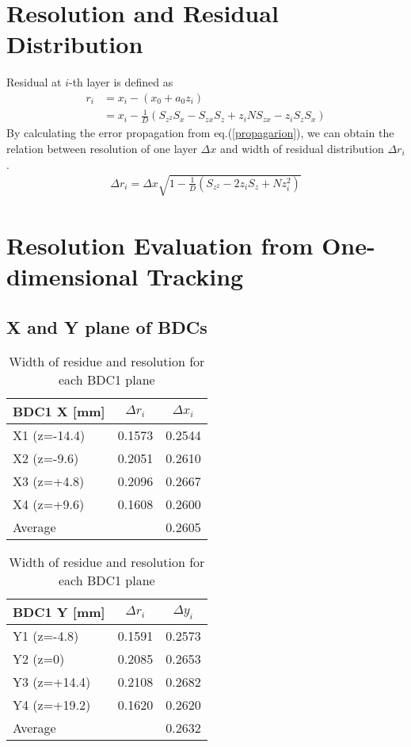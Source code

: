 \section{Resolution and Residual Distribution}
Residual at $i$-th layer is defined as
\begin{align}
    r_i &= x_i - (x_0 + a_0 z_i) \\
        &= x_i - \frac{1}{D}(S_{z^2} S_x - S_{zx} S_z + z_i N S_{zx} - z_i S_z S_x)
\end{align}
By calculating the error propagation from eq.(\ref{propagarion}), we can obtain the relation between resolution of one layer $\Delta x$ and width of residual distribution $\Delta r_i$.
\begin{align}
    \Delta r_i = \Delta x \sqrt{1 - \frac{1}{D} (S_{z^2} - 2z_i S_z + N z_i^2)}
\end{align}

\section{Resolution Evaluation from One-dimensional Tracking}

\subsection{X and Y plane of BDCs}
\begin{table}[h]
\centering
    \begin{tabular}{l|cc}
    \hline
    BDC1 X [mm]& $\Delta r_i$ & $\Delta x_i$     \\
    \hline
    X1 (z=-14.4)& 0.1573 & 0.2544      \\
    X2 (z=-9.6) & 0.2051 & 0.2610      \\
    X3 (z=+4.8) & 0.2096 & 0.2667      \\
    X4 (z=+9.6) & 0.1608 & 0.2600 \\
    \hline
        Average &        & 0.2605  \\
    \hline
\end{tabular}
\begin{tabular}{l|cc}
    \hline
     BDC1 Y [mm]& $\Delta r_i$ & $\Delta y_i$ \\
    \hline
         Y1 (z=-4.8) & 0.1591 & 0.2573 \\
         Y2 (z=0)    & 0.2085 & 0.2653 \\
         Y3 (z=+14.4)& 0.2108 & 0.2682 \\
         Y4 (z=+19.2)& 0.1620 & 0.2620 \\
    \hline
             Average &        & 0.2632 \\
    \hline
    \end{tabular}
    \caption{Width of residue and resolution for each BDC1 plane}
\end{table}

